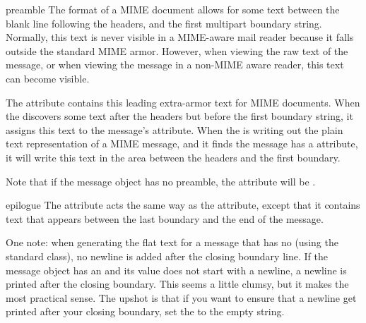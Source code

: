 \begin{datadesc}{preamble}
The format of a MIME document allows for some text between the blank
line following the headers, and the first multipart boundary string.
Normally, this text is never visible in a MIME-aware mail reader
because it falls outside the standard MIME armor.  However, when
viewing the raw text of the message, or when viewing the message in a
non-MIME aware reader, this text can become visible.

The  attribute contains this leading extra-armor text
for MIME documents.  When the  discovers some text after
the headers but before the first boundary string, it assigns this text
to the message's  attribute.  When the 
is writing out the plain text representation of a MIME message, and it
finds the message has a  attribute, it will write this
text in the area between the headers and the first boundary.

Note that if the message object has no preamble, the
 attribute will be .
\end{datadesc}

\begin{datadesc}{epilogue}
The  attribute acts the same way as the 
attribute, except that it contains text that appears between the last
boundary and the end of the message.

One note: when generating the flat text for a 
message that has no  (using the standard
 class), no newline is added after the closing
boundary line.  If the message object has an  and its
value does not start with a newline, a newline is printed after the
closing boundary.  This seems a little clumsy, but it makes the most
practical sense.  The upshot is that if you want to ensure that a
newline get printed after your closing  boundary,
set the  to the empty string.
\end{datadesc}
